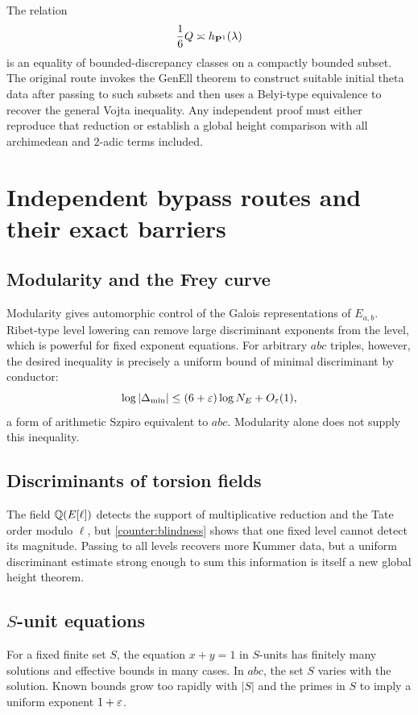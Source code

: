 The relation
\[
 \frac16Q\asymp h_{\mathbf P^1}(\lambda)
\]
is an equality of bounded-discrepancy classes on a compactly bounded subset.  The original route invokes the GenEll theorem to construct suitable initial theta data after passing to such subsets and then uses a Belyi-type equivalence to recover the general Vojta inequality.  Any independent proof must either reproduce that reduction or establish a global height comparison with all archimedean and $2$-adic terms included.

\section{Independent bypass routes and their exact barriers}

\subsection{Modularity and the Frey curve}

Modularity gives automorphic control of the Galois representations of $E_{a,b}$.  Ribet-type level lowering can remove large discriminant exponents from the level, which is powerful for fixed exponent equations.  For arbitrary $abc$ triples, however, the desired inequality is precisely a uniform bound of minimal discriminant by conductor:
\[
 \log|\Delta_{\min}|
 \le(6+\varepsilon)\log N_E+O_\varepsilon(1),
\]
a form of arithmetic Szpiro equivalent to $abc$.  Modularity alone does not supply this inequality.

\subsection{Discriminants of torsion fields}

The field $\mathbb Q(E[\ell])$ detects the support of multiplicative reduction and the Tate order modulo $\ell$, but \cref{counter:blindness} shows that one fixed level cannot detect its magnitude.  Passing to all levels recovers more Kummer data, but a uniform discriminant estimate strong enough to sum this information is itself a new global height theorem.

\subsection{$S$-unit equations}

For a fixed finite set $S$, the equation $x+y=1$ in $S$-units has finitely many solutions and effective bounds in many cases.  In $abc$, the set $S$ varies with the solution.  Known bounds grow too rapidly with $|S|$ and the primes in $S$ to imply a uniform exponent $1+\varepsilon$.

